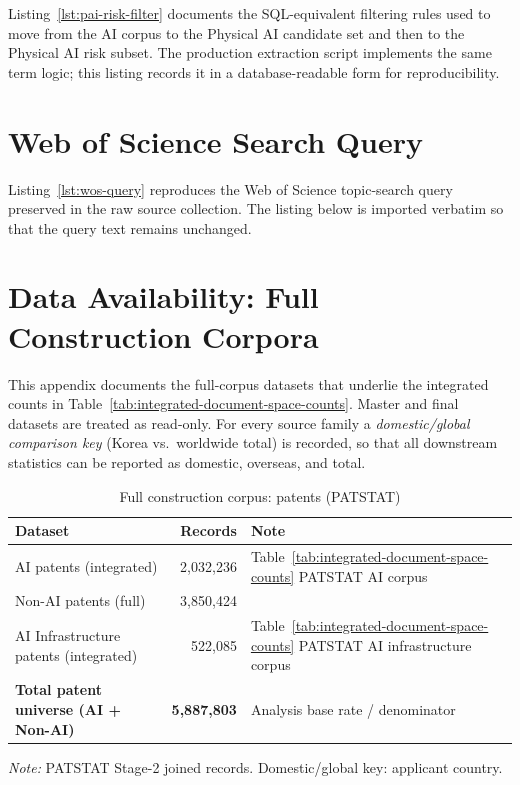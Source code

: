 \documentclass[11pt]{article}
\begin{document}
Listing~\ref{lst:pai-risk-filter} documents the SQL-equivalent filtering rules used to move from the AI corpus to the Physical AI candidate set and then to the Physical AI risk subset. The production extraction script implements the same term logic; this listing records it in a database-readable form for reproducibility.



\section{Web of Science Search Query}

Listing~\ref{lst:wos-query} reproduces the Web of Science topic-search query preserved in the raw source collection. The listing below is imported verbatim so that the query text remains unchanged.



\section{Data Availability: Full Construction Corpora}

This appendix documents the full-corpus datasets that underlie the integrated counts in Table~\ref{tab:integrated-document-space-counts}. Master and final datasets are treated as read-only. For every source family a \emph{domestic/global comparison key} (Korea vs.\ worldwide total) is recorded, so that all downstream statistics can be reported as domestic, overseas, and total.

\begin{table}[htbp]
\centering
\footnotesize
\caption{Full construction corpus: patents (PATSTAT)}
\label{tab:corpus-patents}
\begin{tabularx}{\linewidth}{Xr l}
\toprule
Dataset & Records & Note \\
\midrule
AI patents (integrated) & 2,032,236 & Table~\ref{tab:integrated-document-space-counts} PATSTAT AI corpus \\
Non-AI patents (full) & 3,850,424 & \\
AI Infrastructure patents (integrated) & 522,085 & Table~\ref{tab:integrated-document-space-counts} PATSTAT AI infrastructure corpus \\
\midrule
\textbf{Total patent universe (AI + Non-AI)} & \textbf{5,887,803} & Analysis base rate / denominator \\
\bottomrule
\end{tabularx}
\par\smallskip\begin{minipage}{0.92\linewidth}
\footnotesize\textit{Note:} PATSTAT Stage-2 joined records. Domestic/global key: applicant country.
\end{minipage}
\end{table}
\end{document}
